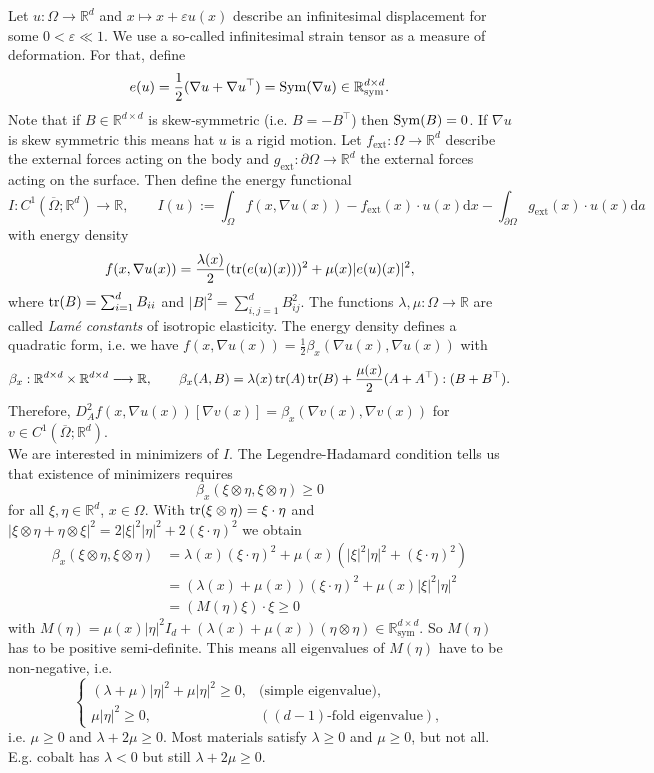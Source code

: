 Let $u:\Omega\longrightarrow\mathbb{R}^d$ and $x\longmapsto x+\varepsilon u(x)$ describe an infinitesimal displacement for some $0<\varepsilon\ll1$. We use a so-called infinitesimal strain tensor as a measure of deformation. For that, define
\[e(u)=\frac{1}{2}(\nabla u+\nabla u^\top)=\operatorname{Sym}\mathopen{}\left(\nabla u\right)\mathclose{}\in\mathbb{R}_{\text{sym}}^{d\times d}.\]
Note that if $B\in\mathbb{R}^{d\times d}$ is skew-symmetric (i.e. $B=-B^\top$) then $\operatorname{Sym}\mathopen{}\left(B\right)\mathclose{}=0$. If $\nabla u$ is skew symmetric this means hat $u$ is a rigid motion. Let $f_\text{ext}:\Omega\longrightarrow\mathbb{R}^d$ describe the external forces acting on the body and $g_\text{ext}:\partial\Omega\longrightarrow\mathbb{R}^d$ the external forces acting on the surface. Then define the energy functional
\[I:C^1(\overline{\Omega};\mathbb{R}^d)\longrightarrow\mathbb{R},\qquad I(u):=\int_\Omega{f(x,\nabla u(x))-f_\text{ext}(x)\cdot u(x)\mathrm{d}x}-\int_{\partial\Omega}{g_\text{ext}(x)\cdot u(x)\mathrm{d}a}\]
with energy density
\[f(x,\nabla u(x))=\frac{\lambda(x)}{2}(\operatorname{tr}\mathopen{}\left(e(u)(x)\right)\mathclose{})^2+\mu(x)\lvert e(u)(x)\rvert^2,\]
where $\operatorname{tr}\mathopen{}\left(B\right)\mathclose{}=\sum_{i=1}^d{B_{ii}}$ and $\lvert B\rvert^2=\sum_{i,j=1}^d{B_{ij}^2}$. The functions $\lambda,\mu:\Omega\longrightarrow\mathbb{R}$ are called \textit{Lam\'e constants} of isotropic elasticity. The energy density defines a quadratic form, i.e. we have $f(x,\nabla u(x))=\frac{1}{2}\beta_x(\nabla u(x),\nabla u(x))$ with
\[\beta_x:\mathbb{R}^{d\times d}\times\mathbb{R}^{d\times d}\longrightarrow\mathbb{R},\qquad\beta_x(A,B)=\lambda(x)\operatorname{tr}\mathopen{}\left(A\right)\mathclose{}\operatorname{tr}\mathopen{}\left(B\right)\mathclose{}+\frac{\mu(x)}{2}(A+A^\top):(B+B^\top).\]
Therefore, $D_A^2f(x,\nabla u(x))[\nabla v(x)]=\beta_x(\nabla v(x),\nabla v(x))$ for $v\in C^1(\overline{\Omega};\mathbb{R}^d)$.\\[11pt]

We are interested in minimizers of $I$. The Legendre-Hadamard condition tells us that existence of minimizers requires
\[\beta_x(\xi\otimes\eta,\xi\otimes\eta)\geq0\]
for all $\xi,\eta\in\mathbb{R}^d$, $x\in\Omega$. With $\operatorname{tr}\mathopen{}\left(\xi\otimes\eta\right)\mathclose{}=\xi\cdot\eta$ and $\lvert\xi\otimes\eta+\eta\otimes\xi\rvert^2=2\lvert\xi\rvert^2\lvert\eta\rvert^2+2(\xi\cdot\eta)^2$ we obtain
\begin{align*}
	\beta_x(\xi\otimes\eta,\xi\otimes\eta)&=\lambda(x)(\xi\cdot\eta)^2+\mu(x)(\lvert\xi\rvert^2\lvert\eta\rvert^2+(\xi\cdot\eta)^2)\\
	&=(\lambda(x)+\mu(x))(\xi\cdot\eta)^2+\mu(x)\lvert\xi\rvert^2\lvert\eta\rvert^2\\
	&=(M(\eta)\xi)\cdot\xi\geq0
\end{align*}
with $M(\eta)=\mu(x)\lvert\eta\rvert^2I_d+(\lambda(x)+\mu(x))(\eta\otimes\eta)\in\mathbb{R}_{\text{sym}}^{d\times d}$. So $M(\eta)$ has to be positive semi-definite. This means all eigenvalues of $M(\eta)$ have to be non-negative, i.e.
\[\left\{\begin{array}{rl}
	(\lambda+\mu)\lvert\eta\rvert^2+\mu\lvert\eta\rvert^2\geq0,&\text{(simple eigenvalue)},\\
	\mu\lvert\eta\rvert^2\geq0,&((d-1)\text{-fold eigenvalue}),
\end{array}\right.\]
i.e. $\mu\geq0$ and $\lambda+2\mu\geq0$. Most materials satisfy $\lambda\geq0$ and $\mu\geq0$, but not all. E.g. cobalt has $\lambda<0$ but still $\lambda+2\mu\geq0$.